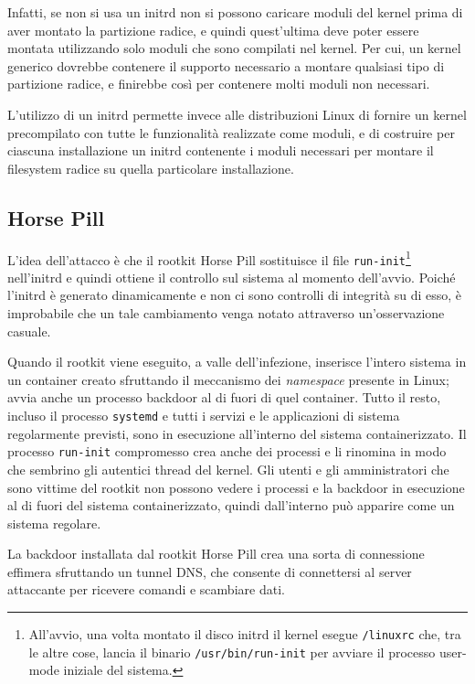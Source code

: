 \documentclass{article}
\begin{document}
Infatti, se non si usa un initrd non si possono caricare moduli del kernel prima di aver montato la partizione radice, e quindi quest'ultima deve poter essere montata utilizzando solo moduli che sono compilati nel kernel. Per cui, un kernel generico dovrebbe contenere il supporto necessario a montare qualsiasi tipo di partizione radice, e finirebbe così per contenere molti moduli non necessari.

L'utilizzo di un initrd permette invece alle distribuzioni Linux di fornire un kernel precompilato con tutte le funzionalità realizzate come moduli, e di costruire per ciascuna installazione un initrd contenente i moduli necessari per montare il filesystem radice su quella particolare installazione.

\subsection{Horse Pill}
L'idea dell'attacco è che il rootkit Horse Pill sostituisce il file \texttt{run-init}\footnote{All'avvio, una volta montato il disco initrd il kernel esegue \texttt{/linuxrc} che, tra le altre cose, lancia il binario \texttt{/usr/bin/run-init} per avviare il processo user-mode iniziale del sistema.} nell'initrd e quindi ottiene il controllo sul sistema al momento dell'avvio. Poiché l'initrd è generato dinamicamente e non ci sono controlli di integrità su di esso, è improbabile che un tale cambiamento venga notato attraverso un'osservazione casuale.

Quando il rootkit viene eseguito, a valle dell'infezione, inserisce l'intero sistema in un container creato sfruttando il meccanismo dei \textsl{namespace} presente in Linux; avvia anche un processo backdoor al di fuori di quel container. Tutto il resto, incluso il processo \texttt{systemd} e tutti i servizi e le applicazioni di sistema regolarmente previsti, sono in esecuzione all'interno del sistema containerizzato. Il processo \texttt{run-init} compromesso crea anche dei processi e li rinomina in modo che sembrino gli autentici thread del kernel. Gli utenti e gli amministratori che sono vittime del rootkit non possono vedere i processi e la backdoor in esecuzione al di fuori del sistema containerizzato, quindi dall'interno può apparire come un sistema regolare.

La backdoor installata dal rootkit Horse Pill crea una sorta di connessione effimera sfruttando un tunnel DNS, che consente di connettersi al server attaccante per ricevere comandi e scambiare dati.
\end{document}
